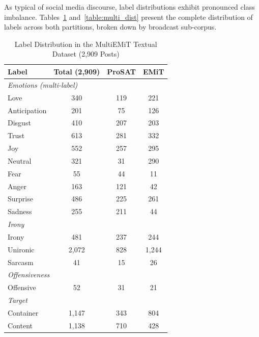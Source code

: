 As typical of social media discourse, label distributions exhibit pronounced class imbalance. Tables~\ref{table:text_dist} and~\ref{table:multi_dist} present the complete distribution of labels across both partitions, broken down by broadcast sub-corpus.

\begin{table}[!t]
\centering
\caption{Label Distribution in the MultiEMiT Textual Dataset (2,909 Posts)}
\label{table:text_dist}
\begin{tabular}{l c c c}
\hline
\textbf{Label} & \textbf{Total (2,909)} & \textbf{ProSAT} & \textbf{EMiT} \\
\hline
\multicolumn{4}{l}{\textit{Emotions (multi-label)}} \\
\hline
Love & 340 & 119 & 221 \\
Anticipation & 201 & 75 & 126 \\
Disgust & 410 & 207 & 203 \\
Trust & 613 & 281 & 332 \\
Joy & 552 & 257 & 295 \\
Neutral & 321 & 31 & 290 \\
Fear & 55 & 44 & 11 \\
Anger & 163 & 121 & 42 \\
Surprise & 486 & 225 & 261 \\
Sadness & 255 & 211 & 44 \\
\hline
\multicolumn{4}{l}{\textit{Irony}} \\
\hline
Irony & 481 & 237 & 244 \\
Unironic & 2,072 & 828 & 1,244 \\
Sarcasm & 41 & 15 & 26 \\
\hline
\multicolumn{4}{l}{\textit{Offensiveness}} \\
\hline
Offensive & 52 & 31 & 21 \\
\hline
\multicolumn{4}{l}{\textit{Target}} \\
\hline
Container & 1,147 & 343 & 804 \\
Content & 1,138 & 710 & 428 \\
\hline
\end{tabular}
\end{table}

